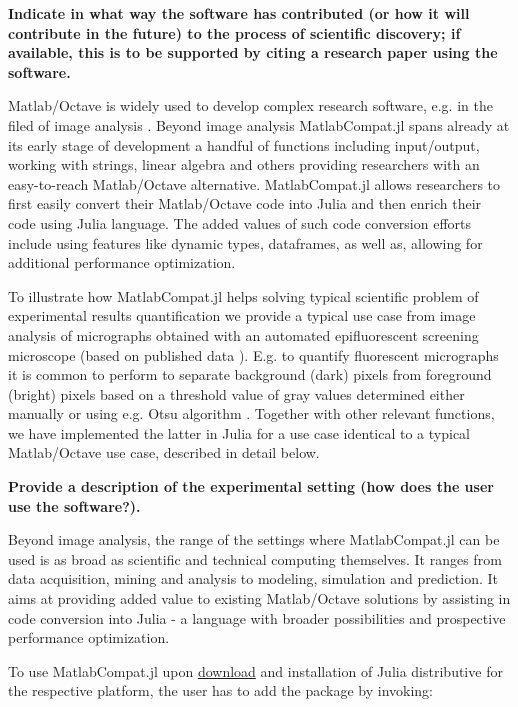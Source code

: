 \textbf{Indicate in what way the software has contributed (or how it will contribute in the future) to the process of scientific discovery; if available, this is to be supported by citing a research paper using the software.}

Matlab/Octave is widely used to develop complex research software, e.g. in the filed of image analysis \cite{Kiss_2014, 17076895}. Beyond image analysis MatlabCompat.jl spans already at its early stage of development a handful of functions including input/output, working with strings, linear algebra and others providing researchers with an easy-to-reach Matlab/Octave alternative. MatlabCompat.jl allows researchers to first easily convert their Matlab/Octave code into Julia and then enrich their code using Julia language. The added values of such code conversion efforts include using features like dynamic types, dataframes, as well as, allowing for additional performance optimization.

To illustrate how MatlabCompat.jl helps solving typical scientific problem of experimental results quantification we provide a typical use case from image analysis of micrographs obtained with an automated epifluorescent screening microscope (based on published data \cite{22787215}). E.g. to quantify fluorescent micrographs it is common to perform to separate background (dark) pixels from foreground (bright) pixels based on a threshold value of gray values determined either manually or using e.g. Otsu algorithm \cite{otsu1975threshold}. Together with other relevant functions, we have implemented the latter in Julia for a use case identical to a typical Matlab/Octave use case, described in detail below.

\textbf{Provide a description of the experimental setting (how does the user use the software?).}

Beyond image analysis, the range of the settings where MatlabCompat.jl can be used is as broad as scientific and technical computing themselves. It ranges from data acquisition, mining and analysis to modeling, simulation and prediction. It aims at providing added value to existing Matlab/Octave solutions by assisting in code conversion into Julia - a language with broader possibilities and prospective performance optimization.

To use MatlabCompat.jl upon \href{http://julialang.org/downloads/}{download} and installation of Julia distributive for the respective platform, the user has to add the package by invoking:\\

